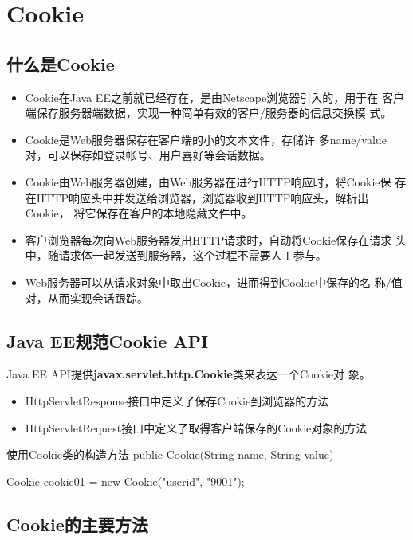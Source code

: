 \section{Cookie}

\subsection{什么是Cookie} 

\begin{itemize}
\item Cookie在Java EE之前就已经存在，是由Netscape浏览器引入的，用于在
  客户端保存服务器端数据，实现一种简单有效的客户/服务器的信息交换模
  式。
\item Cookie是Web服务器保存在客户端的小的文本文件，存储许
  多name/value对，可以保存如登录帐号、用户喜好等会话数据。
\item Cookie由Web服务器创建，由Web服务器在进行HTTP响应时，将Cookie保
  存在HTTP响应头中并发送给浏览器，浏览器收到HTTP响应头，解析出Cookie，
  将它保存在客户的本地隐藏文件中。
\item 客户浏览器每次向Web服务器发出HTTP请求时，自动将Cookie保存在请求
  头中，随请求体一起发送到服务器，这个过程不需要人工参与。
\item Web服务器可以从请求对象中取出Cookie，进而得到Cookie中保存的名
  称/值对，从而实现会话跟踪。
\end{itemize}

\subsection{Java EE规范Cookie API} 

Java EE API提供{\bf\Blue javax.servlet.http.Cookie}类来表达一个Cookie对
象。

\begin{itemize}\kai
\item HttpServletResponse接口中定义了保存Cookie到浏览器的方法
\item HttpServletRequest接口中定义了取得客户端保存的Cookie对象的方法
\end{itemize}


使用Cookie类的构造方法 public Cookie(String name, String value)

\begin{javaCode}
  Cookie cookie01 = new Cookie("userid", "9001");
\end{javaCode}

\subsection{Cookie的主要方法} 

